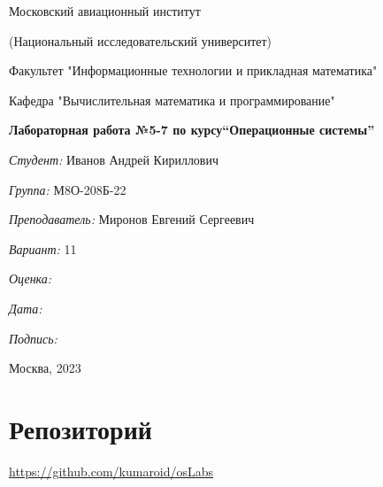 \documentclass[a4paper, 12pt]{article}
\begin{document}
\thispagestyle{empty}	
\begin{center}
	Московский авиационный институт
	
	(Национальный исследовательский университет)
	
	Факультет "Информационные технологии и прикладная математика"
	
	Кафедра "Вычислительная математика и программирование"
	
\end{center}
\vspace{40ex}
\begin{center}
	\textbf{\large{Лабораторная работа №5-7 по курсу\linebreak \textquotedblleft Операционные системы\textquotedblright}}
\end{center}
\vspace{35ex}
\begin{flushright}
	\textit{Студент: } Иванов Андрей Кириллович
	
	\vspace{2ex}
	\textit{Группа: } М8О-208Б-22
	
	\vspace{2ex}
	\textit{Преподаватель: } Миронов Евгений Сергеевич
	
	\vspace{2ex}
	\textit{Вариант: } 11
	
	\vspace{2ex}
	\textit{Оценка: } \underline{\quad\quad\quad\quad\quad\quad}
	
	 \vspace{2ex}
	\textit{Дата: } \underline{\quad\quad\quad\quad\quad\quad}
	
	\vspace{2ex}
	\textit{Подпись: } \underline{\quad\quad\quad\quad\quad\quad}
	
\end{flushright}

\vspace{5ex}

\begin{vfill}
	\begin{center}
		Москва, 2023
	\end{center}	
\end{vfill}
\newpage

\begingroup
\color{black}
\tableofcontents\newpage
\endgroup

\section{Репозиторий}
\href{https://github.com/kumaroid/osLabs}{https://github.com/kumaroid/osLabs}
\end{document}
